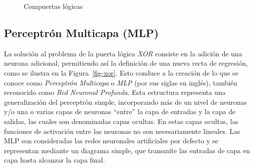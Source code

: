 \documentclass[
  us-letterpaper,
]{scrreprt}
\theoremstyle{plain}
\theoremstyle{definition}
\theoremstyle{plain}
\theoremstyle{definition}
\theoremstyle{remark}
\begin{document}
\begin{figure}
\begin{minipage}{0.33\linewidth}
{}

\subcaption{\label{fig-and}}

\end{minipage}%
%
\begin{minipage}{0.33\linewidth}


\subcaption{\label{fig-xor}}

\end{minipage}%

\caption{\label{fig-compuertas}Compuertas lógicas}

\end{figure}%

\subsection{Perceptrón Multicapa (MLP)}\label{sec-arqmlp}

La solución al problema de la puerta lógica \emph{XOR} consiste en la
adición de una neurona adicional, permitiendo así la definición de una
nueva recta de regresión, como se ilustra en la Figura~\ref{fig-xor}.
Esto conduce a la creación de lo que se conoce como \emph{Perceptrón
Multicapa} o \emph{MLP} (por sus siglas en inglés), también reconocido
como \emph{Red Neuronal Profunda}. Esta estructura representa una
generalización del perceptrón simple, incorporando más de un nivel de
neuronas y/o una o varias capas de neuronas ``entre'' la capa de
entradas y la capa de salidas, las cuales son denominadas capas ocultas.
En estas capas ocultas, las funciones de activación entre las neuronas
no son necesariamente lineales. Las MLP son consideradas las redes
neuronales artificiales por defecto y se representan mediante un
diagrama simple, que transmite las entradas de capa en capa hasta
alcanzar la capa final.
\end{document}
